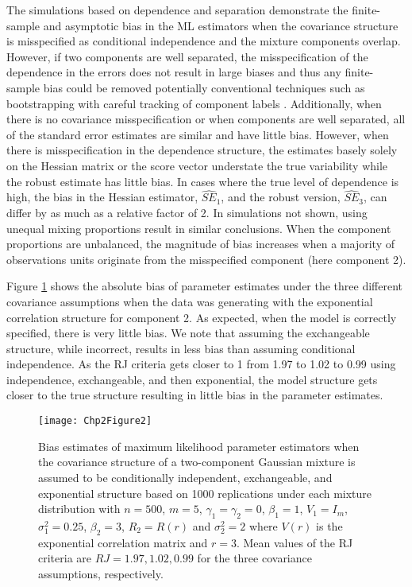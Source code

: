 The simulations based on dependence and separation demonstrate the finite-sample and asymptotic bias in the ML estimators when the covariance structure is misspecified as conditional independence and the mixture components overlap. However, if two components are well separated, the misspecification of the dependence in the errors does not result in large biases and thus any finite-sample bias could be removed potentially conventional techniques such as bootstrapping with careful tracking of component labels \cite{grun2004}. Additionally, when there is no covariance misspecification or when components are well separated, all of the standard error estimates are similar and have little bias. However, when there is misspecification in the dependence structure, the estimates basely solely on the Hessian matrix or the score vector understate the true variability while the robust estimate has little bias. In cases where the true level of dependence is high, the bias in the Hessian estimator, $\widehat{SE}_{1}$, and the robust version, $\widehat{SE}_{3}$, can differ by as much as a relative factor of 2. In simulations not shown, using unequal mixing proportions result in similar conclusions. When the component proportions are unbalanced, the magnitude of bias increases when a majority of observations units originate from the misspecified component (here component 2). 

Figure \ref{fig:2-2} shows the absolute bias of parameter estimates under the three different covariance assumptions when the data was generating with the exponential correlation structure for component 2. As expected, when the model is correctly specified, there is very little bias. We note that assuming the exchangeable structure, while incorrect, results in less bias than assuming conditional independence. As the RJ criteria gets closer to 1 from 1.97 to 1.02 to 0.99 using independence, exchangeable, and then exponential, the model structure gets closer to the true structure resulting in little bias in the parameter estimates.
\begin{figure}
\begin{center}
\texttt{[image: Chp2Figure2]}
\end{center}
\caption{Bias estimates of maximum likelihood parameter estimators when the covariance structure of a two-component Gaussian mixture is assumed to be conditionally independent, exchangeable, and exponential structure based on 1000 replications under each mixture distribution with $n=500$, $m=5$, $\gamma_1=\gamma_2=0$, $\beta_{1}=1$, $V_1=I_{m}$, $\sigma_1^{2}=0.25$, $\beta_2=3$, $R_2=R(r)$ and $\sigma_2^{2}=2$ where $V(r)$ is the exponential correlation matrix and $r=3$. Mean values of the RJ criteria are $RJ = 1.97, 1.02, 0.99$ for the three covariance assumptions, respectively.}
\label{fig:2-2}
\end{figure}

